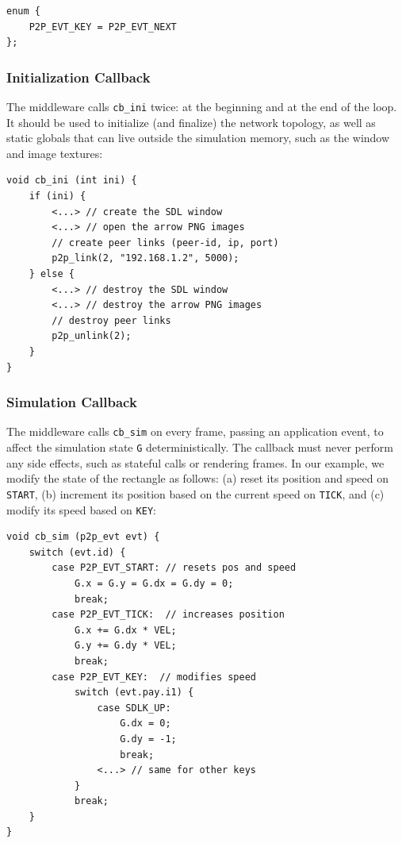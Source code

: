 \documentclass[10pt,journal,compsoc]{IEEEtran}
\newcommand{\code}[1]  {\texttt{\footnotesize{#1}}}
\begin{document}
{\footnotesize
\begin{verbatim}
enum {
    P2P_EVT_KEY = P2P_EVT_NEXT
};
\end{verbatim}
}

\subsubsection{Initialization Callback}

The middleware calls \code{cb\_ini} twice: at the beginning and at the end of
the loop.
It should be used to initialize (and finalize) the network topology, as well
as static globals that can live outside the simulation memory, such as the
window and image textures:

{\footnotesize
\begin{verbatim}
void cb_ini (int ini) {
    if (ini) {
        <...> // create the SDL window
        <...> // open the arrow PNG images
        // create peer links (peer-id, ip, port)
        p2p_link(2, "192.168.1.2", 5000);
    } else {
        <...> // destroy the SDL window
        <...> // destroy the arrow PNG images
        // destroy peer links
        p2p_unlink(2);
    }
}
\end{verbatim}
}

\subsubsection{Simulation Callback}

The middleware calls \code{cb\_sim} on every frame, passing an application
event, to affect the simulation state \code{G} deterministically.
The callback must never perform any side effects, such as stateful calls or
rendering frames.
In our example, we modify the state of the rectangle as follows:
    (a) reset its position and speed on \code{START},
    (b) increment its position based on the current speed on \code{TICK}, and
    (c) modify its speed based on \code{KEY}:

{\footnotesize
\begin{verbatim}
void cb_sim (p2p_evt evt) {
    switch (evt.id) {
        case P2P_EVT_START: // resets pos and speed
            G.x = G.y = G.dx = G.dy = 0;
            break;
        case P2P_EVT_TICK:  // increases position
            G.x += G.dx * VEL;
            G.y += G.dy * VEL;
            break;
        case P2P_EVT_KEY:  // modifies speed
            switch (evt.pay.i1) {
                case SDLK_UP:
                    G.dx = 0;
                    G.dy = -1;
                    break;
                <...> // same for other keys
            }
            break;
    }
}
\end{verbatim}
}
\end{document}
